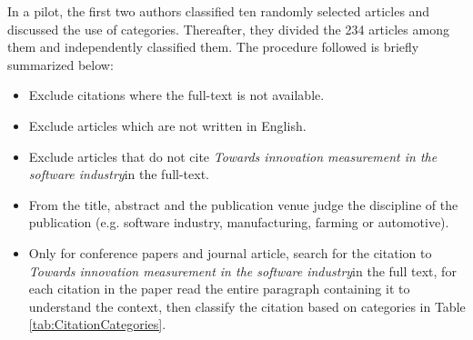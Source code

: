 \documentclass[sigplan]{acmart}
\newcommand{\theArticle}{\textit{Towards innovation measurement in the software industry}}
\begin{document}
In a pilot, the first two authors classified ten randomly selected articles and discussed the use of categories. Thereafter, they divided the 234 articles among them and  independently classified them. The procedure followed is briefly summarized below: 
\begin{itemize}
\item Exclude citations where the full-text is not available. 
\item Exclude articles which are not written in English.
\item Exclude articles  that do not cite \theArticle in the full-text.
\item From the title, abstract and the publication venue judge the discipline of the publication (e.g. software industry, manufacturing, farming or automotive).
\item Only for conference papers and journal article, search for the citation to \theArticle in the full text, for each citation in the paper  read the entire paragraph containing it to understand the context, then classify the citation based on categories in Table \ref{tab:CitationCategories}.
\end{itemize}
 
\end{document}
